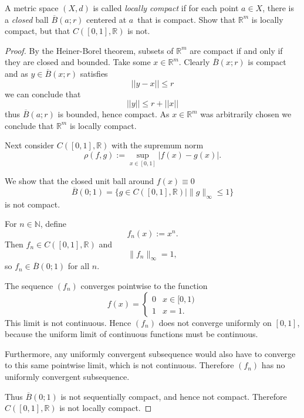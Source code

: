 \begin{prob}
    A metric space $(X,d)$ is called \emph{locally compact} if 
    for each point $a \in X$, there is a \emph{closed} ball 
    $\overline B(a;r)$ centered at $a$ that is compact. Show that 
    $\mathbb R^m$ is locally compact, but that $C([0,1], \mathbb R)$
    is not.
\end{prob}
\begin{proof}
    By the Heiner-Borel theorem, subsets of $\mathbb R^m$ are 
    compact if and only if they are closed and bounded. 
    Take some $x \in \mathbb R^m$. Clearly $\overline B(x;r)$ 
    is compact and as $y \in \overline B(x;r)$ satisfies 
    \[
        ||y - x|| \leq r 
    \]
    we can conclude that 
    \[
        ||y|| \leq r + ||x||
    \]
    thus $\overline B(a;r)$ is bounded, hence compact. As 
    $x\in \mathbb R^m$ was arbitrarily chosen we conclude that 
    $\mathbb R^m$ is locally compact.  

    Next consider $C([0,1],\mathbb R)$ with the supremum norm
    \[
        \rho(f,g) := \sup_{x\in[0,1]} |f(x)-g(x)|.
    \]

    We show that the closed unit ball around $f(x)\equiv0$
    \[
        \overline B(0;1) =
        \{g \in C([0,1],\mathbb R) \mid \|g\|_\infty \le 1\}
    \]
    is not compact.

    For $n\in\mathbb N$, define
    \[
        f_n(x) := x^n .
    \]
    Then $f_n \in C([0,1],\mathbb R)$ and
    \[
        \|f_n\|_\infty = 1,
    \]
    so $f_n \in \overline B(0;1)$ for all $n$.

    The sequence $(f_n)$ converges pointwise to the function
    \[
        f(x) =
        \begin{cases}
            0 & x\in[0,1) \\
            1 & x=1 .
        \end{cases}
    \]
    This limit is not continuous. Hence $(f_n)$ does not converge
    uniformly on $[0,1]$, because the uniform limit of continuous
    functions must be continuous.

    Furthermore, any uniformly convergent subsequence would also
    have to converge to this same pointwise limit, which is not
    continuous. Therefore $(f_n)$ has no uniformly convergent
    subsequence.

    Thus $\overline B(0;1)$ is not sequentially compact, and hence
    not compact. Therefore $C([0,1],\mathbb R)$ is not locally
    compact.
\end{proof}
 
